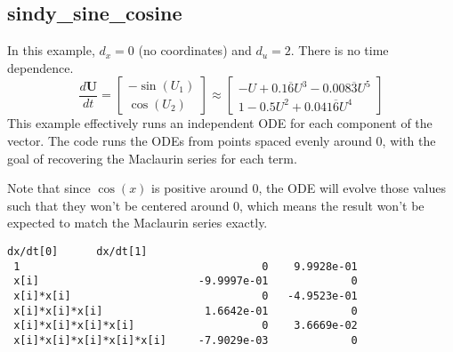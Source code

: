 \documentclass{article}
\let\vec\mathbf
\begin{document}
\subsection{sindy\_sine\_cosine}
In this example, $d_x = 0$ (no coordinates) and $d_u = 2$. There is no time dependence.
\begin{equation*}
\frac{d\vec{U}}{dt} =
\begin{bmatrix}
-\sin(U_1) \\ \cos(U_2)
\end{bmatrix}
\approx
\begin{bmatrix}
 -U + 0.1\overline{6}U^3 - 0.008\overline{3}U^5 \\  1 - 0.5U^2 +  0.041\overline{6}U^4
\end{bmatrix}
\end{equation*}
This example effectively runs an independent ODE for each component of the vector.
The code runs the ODEs from points spaced evenly around 0, with the goal of
recovering the Maclaurin series for each term.

Note that since $\cos(x)$ is positive around 0, the ODE will evolve those values
such that they won't be centered around 0, which means the result won't be
expected to match the Maclaurin series exactly.
\begin{lstlisting}[language={}]
                                dx/dt[0]      dx/dt[1]
 1                                      0    9.9928e-01
 x[i]                         -9.9997e-01             0
 x[i]*x[i]                              0   -4.9523e-01
 x[i]*x[i]*x[i]                1.6642e-01             0
 x[i]*x[i]*x[i]*x[i]                    0    3.6669e-02
 x[i]*x[i]*x[i]*x[i]*x[i]     -7.9029e-03             0
\end{lstlisting}
\end{document}

